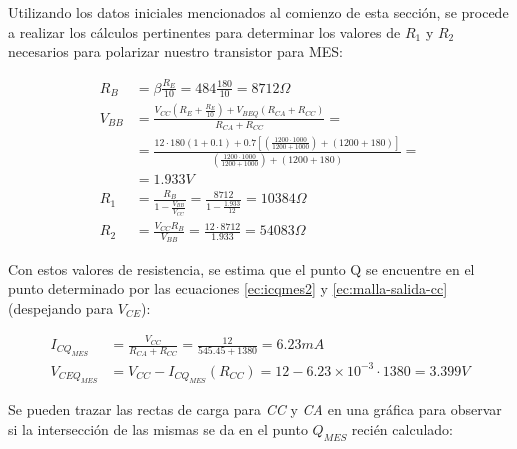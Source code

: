 Utilizando los datos iniciales mencionados al comienzo de esta sección, se procede
a realizar los cálculos pertinentes para determinar los valores de $R_1$ y $R_2$ necesarios
para polarizar nuestro transistor para MES:

\begin{align*}
    R_B &= \beta \frac{R_E}{10} = 484\frac{180}{10} = \boxed{8712\Omega}\\[6pt]
    V_{BB} &= \frac{V_{CC}(R_E +\frac{R_E}{10}) + V_{BEQ}(R_{CA}+R_{CC})}{R_{CA}+R_{CC}} = \\[6pt]
    &= \frac{12 \cdot 180(1+0.1) + 0.7[(\frac{1200\cdot1000}{1200+1000})+(1200+180)]}{(\frac{1200\cdot1000}{1200+1000})+(1200+180)} = \\[6pt]
    &= \boxed{1.933V}\\[6pt]
    R_1 &= \frac{R_B}{1-\frac{V_{BB}}{V_{CC}}} = \frac{8712}{1-\frac{1.933}{12}} = \boxed{10384\Omega}\\[6pt]
    R_2 &= \frac{V_{CC}R_B}{V_{BB}} = \frac{12\cdot8712}{1.933} = \boxed{54083\Omega}
\end{align*}

Con estos valores de resistencia, se estima que el punto Q se encuentre en el punto
determinado por las ecuaciones \ref{ec:icqmes2} y \ref{ec:malla-salida-cc} (despejando
para $V_{CE}$):

\begin{align*}
    I_{CQ_{MES}} &= \frac{V_{CC}}{R_{CA} + R_{CC}} = \frac{12}{545.45+1380} = \boxed{6.23mA}\\[6pt]
    V_{CEQ_{MES}} &= V_{CC} - I_{CQ_{MES}}(R_{CC}) = 12-6.23\times10^{-3} \cdot 1380 = \boxed{3.399V}
\end{align*}

Se pueden trazar las rectas de carga para \emph{CC} y \emph{CA} en una gráfica para
observar si la intersección de las mismas se da en el punto $Q_{MES}$ recién calculado:

